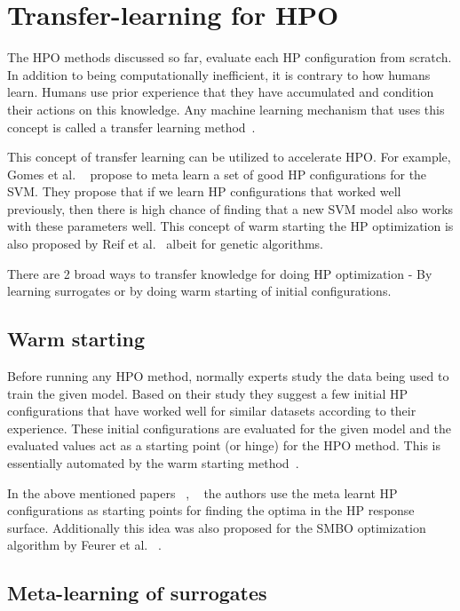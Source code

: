 \documentclass[12pt, twoside, ngerman]{report}
\begin{document}
\section{Transfer-learning for HPO}

The HPO methods discussed so far,  evaluate each HP configuration from scratch.
In addition to being computationally inefficient,  it is contrary to how humans learn.
Humans use prior experience that they have accumulated and condition their actions on this knowledge.
Any machine learning mechanism that uses this concept is called a transfer learning method~\cite{Weiss2016}.

This concept of transfer learning can be utilized to accelerate HPO.
For example,  Gomes et al. ~\cite{svmhpmetalearnt} propose to meta learn a set of good HP configurations for the SVM.
They propose that if we learn HP configurations that worked well previously,  then there is high chance of finding that a new SVM model also works with these parameters well.
This concept of warm starting the HP optimization is also proposed by Reif et al.~\cite{metalearningwarmstartpaper} albeit for genetic algorithms.

There are 2 broad ways to transfer knowledge for doing HP optimization - By learning surrogates or by doing warm starting of initial configurations.

\subsection{Warm starting}

Before running any HPO method,  normally experts study the data being used to train the given model.
Based on their study they suggest a few initial HP configurations that have worked well for similar datasets according to their experience.
These initial configurations are evaluated for the given model and the evaluated values act as a starting point (or hinge) for the HPO method.
This is essentially automated by the warm starting method~\cite{Feurer2014UsingMT}.

In the above mentioned papers ~\cite{svmhpmetalearnt},  ~\cite{metalearningwarmstartpaper} the authors use the meta learnt HP configurations as starting points for finding the optima in the HP response surface.
Additionally this idea was also proposed for the SMBO optimization algorithm by Feurer et al. ~\cite{Feurer2014UsingMT}.


\subsection{Meta-learning of surrogates}
\end{document}
